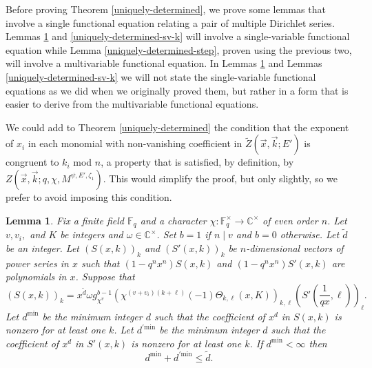 \documentclass[11pt,letterpaper]{article}
\newtheorem{lemma}[theorem]{Lemma}
\theoremstyle{definition}
\theoremstyle{remark}
\numberwithin{equation}{section}
\theoremstyle{dotless}
\newcommand{\hchi}{\psi} %
\newcommand{\gene}{\zeta_1} %
\renewcommand{\tilde}{\widetilde}
\begin{document}
Before proving Theorem \ref{uniquely-determined}, we prove some lemmas that involve a single functional equation relating a pair of multiple Dirichlet series. Lemmas \ref{uniquely-determined-sv-d} and \ref{uniquely-determined-sv-k} will involve a single-variable functional equation while Lemma \ref{uniquely-determined-step}, proven using the previous two, will involve a multivariable functional equation. In Lemmas \ref{uniquely-determined-sv-d} and Lemmas \ref{uniquely-determined-sv-k} we will not state the single-variable functional equations as we did when we originally proved them, but rather in a form that is easier to derive from the multivariable functional equations.

We could add to Theorem \ref{uniquely-determined} the condition that the exponent of $x_i$ in each monomial with non-vanishing coefficient in $\tilde{Z}(\vec{x}, \vec{k}; E')$ is congruent to $k_i$ mod $n$, a property that is satisfied, by definition, by $ Z(\vec{x}, \vec{k} ; q, \chi, M^{\hchi,E',\gene})$. This would simplify the proof, but only slightly, so we prefer to avoid imposing this condition.

\begin{lemma}\label{uniquely-determined-sv-d}  Fix a finite field $\mathbb F_q$ and a character $\chi \colon \mathbb F_q^\times \to \mathbb C^\times$ of even order $n$. Let $v, v_i,$ and $K$ be integers and $\omega \in \mathbb C^\times$. Set $b=1$ if $n\mid v$ and $b=0$ otherwise.  Let $\tilde{d}$ be an integer. Let $(S(x,k))_k$ and $(S'(x,k))_k$ be $n$-dimensional vectors of power series in $x$ such that $(1-q^n x^n) S(x,k)$ and $(1-q^n x^n) S'(x,k)$ are polynomials in $x$. Suppose that
\begin{equation}\label{ud-sv-d-fe} (S(x,k))_k = x^{\tilde{d}} \omega g_{\chi^v}^{b-1}\left(\chi^{(v+v_i)(k+\ell)}(-1)\Theta_{k, \ell}(x, K) \right)_{k, \ell}  \left(S'(\frac{1}{qx} ,\ell)\right)_\ell.\end{equation} 
Let $d^{\mathrm{min}}$ be the minimum integer $d$ such that the coefficient of $x^d$ in $S(x,k)$ is nonzero for at least one $k$. Let $d^{'\mathrm{min}}$ be the minimum integer $d$ such that the coefficient of $x^d$ in $S'(x,k)$ is nonzero for at least one $k$.  
If $d^{\mathrm{min}}<\infty$ then \begin{equation} \label{di-bound-d} d^{\mathrm{min}}+d^{'\mathrm{min}} \leq \tilde{d}. \end{equation} \end{lemma}
\end{document}
